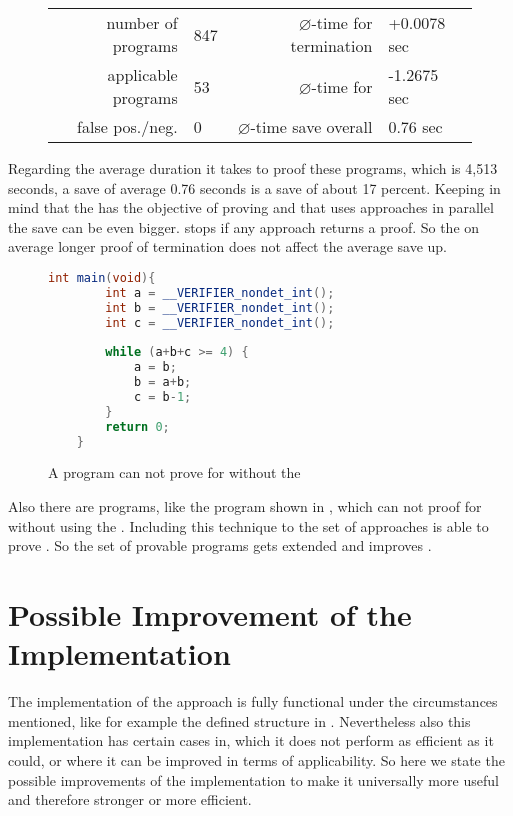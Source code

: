 \begin{figure}[H]
	\centering
	\begin{tabular}{rlrl}
		number of programs 	& 847 & $\varnothing$-time for termination & +0.0078 sec \\
		applicable programs & 53 & $\varnothing$-time for \nonterm & -1.2675 sec \\
		false pos./neg. & 0 & $\varnothing$-time save overall & 0.76 sec \\
	\end{tabular}	
\end{figure}

Regarding the average duration it takes \aprove to proof these programs, which is 4,513 seconds, a save of average 0.76 seconds is a save of about 17 percent. Keeping in mind that the \gnanal has the objective of proving \nonterm and that \aprove uses approaches in parallel the save can be even bigger. \aprove stops if any approach returns a proof. So the on average longer proof of termination does not affect the average save up. \newline
\begin{figure}[H]
	\begin{lstlisting}[language = java]
	int main(void){
		int a = __VERIFIER_nondet_int();
		int b = __VERIFIER_nondet_int();
		int c = __VERIFIER_nondet_int();
		
		while (a+b+c >= 4) {
			a = b;
			b = a+b;
			c = b-1;
		}
		return 0;
	}
	\end{lstlisting}
	\caption{A program \aprove can not prove \nonterm for without the \gnanal}
	\label{fig:program-newproof}
\end{figure}
Also there are programs, like the program shown in , which \aprove can not proof \nonterm for without using the \gnanal. Including this technique to the set of approaches \aprove is able to prove \nonterm. So the set of provable programs gets extended and improves \aprove.


\section{Possible Improvement of the Implementation}
The implementation of the approach is fully functional under the circumstances mentioned, like for example the defined structure in . Nevertheless also this implementation has certain cases in, which it does not perform as efficient as it could, or where it can be improved in terms of applicability.
So here we state the possible improvements of the implementation to make it universally more useful and therefore stronger or more efficient.
